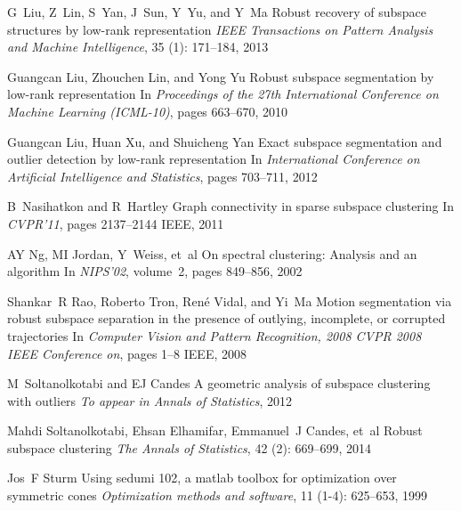 \documentclass[12pt,heading]{ctexbook}
\begin{document}
\begin{thebibliography}{99}
    G~Liu, Z~Lin, S~Yan, J~Sun, Y~Yu, and Y~Ma
    \newblock Robust recovery of subspace structures by low-rank representation
    \newblock \emph{IEEE Transactions on Pattern Analysis and Machine
    Intelligence}, 35 (1): 171--184, 2013

    Guangcan Liu, Zhouchen Lin, and Yong Yu
    \newblock Robust subspace segmentation by low-rank representation
    \newblock In \emph{Proceedings of the 27th International Conference on Machine
    Learning (ICML-10)}, pages 663--670, 2010

    Guangcan Liu, Huan Xu, and Shuicheng Yan
    \newblock Exact subspace segmentation and outlier detection by low-rank
    representation
    \newblock In \emph{International Conference on Artificial Intelligence and
    Statistics}, pages 703--711, 2012

    B~Nasihatkon and R~Hartley
    \newblock Graph connectivity in sparse subspace clustering
    \newblock In \emph{CVPR'11}, pages 2137--2144 IEEE, 2011

    AY Ng, MI Jordan, Y~Weiss, et~al
    \newblock On spectral clustering: Analysis and an algorithm
    \newblock In \emph{NIPS'02}, volume~2, pages 849--856, 2002

    Shankar~R Rao, Roberto Tron, Ren{\'e} Vidal, and Yi~Ma
    \newblock Motion segmentation via robust subspace separation in the presence of
    outlying, incomplete, or corrupted trajectories
    \newblock In \emph{Computer Vision and Pattern Recognition, 2008 CVPR 2008
    IEEE Conference on}, pages 1--8 IEEE, 2008

    M~Soltanolkotabi and EJ Candes
    \newblock A geometric analysis of subspace clustering with outliers
    \newblock \emph{To appear in Annals of Statistics}, 2012

    Mahdi Soltanolkotabi, Ehsan Elhamifar, Emmanuel~J Candes, et~al
    \newblock Robust subspace clustering
    \newblock \emph{The Annals of Statistics}, 42 (2): 669--699,
    2014

    Jos~F Sturm
    \newblock Using sedumi 102, a matlab toolbox for optimization over symmetric
    cones
    \newblock \emph{Optimization methods and software}, 11 (1-4):
    625--653, 1999


\end{thebibliography}
\end{document}
